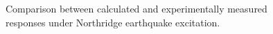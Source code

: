 \begin{figure}[H]
\centering
{}
\caption{Comparison between calculated and experimentally measured responses under Northridge earthquake excitation.}
\label{fig:8-10}
\end{figure}

